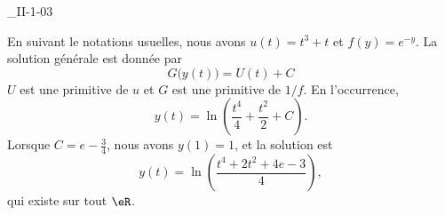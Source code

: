 

\begin{corrige}{_II-1-03}

En suivant le notations usuelles, nous avons $u(t)=t^3+t$ et $f(y)= e^{-y}$. La solution générale est donnée par
\begin{equation}
	G\big( y(t) \big)=U(t)+C
\end{equation}
$U$ est une primitive de $u$ et $G$ est une primitive de $1/f$. En l'occurrence,
\begin{equation}
	y(t)=\ln\left( \frac{ t^4 }{ 4 }+\frac{ t^2 }{ 2 }+C \right).
\end{equation}
Lorsque $C=e-\frac{ 3 }{ 4 }$, nous avons $y(1)=1$, et la solution est
\begin{equation}
	y(t)=\ln\left( \frac{ t^4+2t^2+4e-3 }{ 4 } \right),
\end{equation}
qui existe sur tout $\eR$.

\end{corrige}
